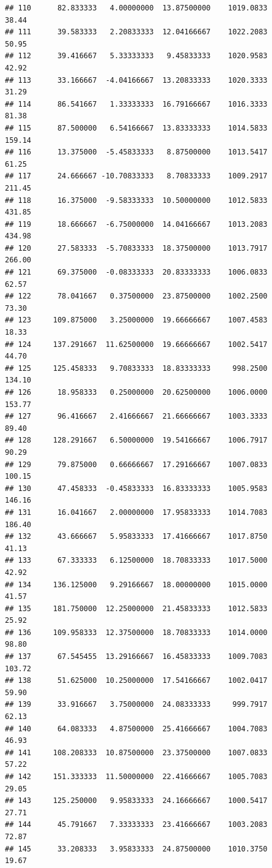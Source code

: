 \documentclass[
]{article}
\begin{document}
\begin{verbatim}
## 110      82.833333   4.00000000  13.87500000    1019.0833       38.44
## 111      39.583333   2.20833333  12.04166667    1022.2083       50.95
## 112      39.416667   5.33333333   9.45833333    1020.9583       42.92
## 113      33.166667  -4.04166667  13.20833333    1020.3333       31.29
## 114      86.541667   1.33333333  16.79166667    1016.3333       81.38
## 115      87.500000   6.54166667  13.83333333    1014.5833      159.14
## 116      13.375000  -5.45833333   8.87500000    1013.5417       61.25
## 117      24.666667 -10.70833333   8.70833333    1009.2917      211.45
## 118      16.375000  -9.58333333  10.50000000    1012.5833      431.85
## 119      18.666667  -6.75000000  14.04166667    1013.2083      434.98
## 120      27.583333  -5.70833333  18.37500000    1013.7917      266.00
## 121      69.375000  -0.08333333  20.83333333    1006.0833       62.57
## 122      78.041667   0.37500000  23.87500000    1002.2500       73.30
## 123     109.875000   3.25000000  19.66666667    1007.4583       18.33
## 124     137.291667  11.62500000  19.66666667    1002.5417       44.70
## 125     125.458333   9.70833333  18.83333333     998.2500      134.10
## 126      18.958333   0.25000000  20.62500000    1006.0000      153.77
## 127      96.416667   2.41666667  21.66666667    1003.3333       89.40
## 128     128.291667   6.50000000  19.54166667    1006.7917       90.29
## 129      79.875000   0.66666667  17.29166667    1007.0833      100.15
## 130      47.458333  -0.45833333  16.83333333    1005.9583      146.16
## 131      16.041667   2.00000000  17.95833333    1014.7083      186.40
## 132      43.666667   5.95833333  17.41666667    1017.8750       41.13
## 133      67.333333   6.12500000  18.70833333    1017.5000       42.92
## 134     136.125000   9.29166667  18.00000000    1015.0000       41.57
## 135     181.750000  12.25000000  21.45833333    1012.5833       25.92
## 136     109.958333  12.37500000  18.70833333    1014.0000       98.80
## 137      67.545455  13.29166667  16.45833333    1009.7083      103.72
## 138      51.625000  10.25000000  17.54166667    1002.0417       59.90
## 139      33.916667   3.75000000  24.08333333     999.7917       62.13
## 140      64.083333   4.87500000  25.41666667    1004.7083       46.93
## 141     108.208333  10.87500000  23.37500000    1007.0833       57.22
## 142     151.333333  11.50000000  22.41666667    1005.7083       29.05
## 143     125.250000   9.95833333  24.16666667    1000.5417       27.71
## 144      45.791667   7.33333333  23.41666667    1003.2083       72.87
## 145      33.208333   3.95833333  24.87500000    1010.3750       19.67

\end{verbatim}
\end{document}
